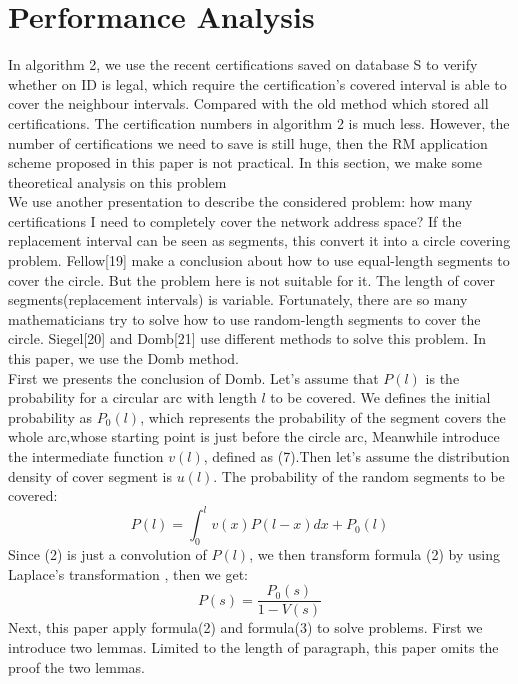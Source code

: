 \documentclass[10pt]{article}
\begin{document}
\section{Performance Analysis}
In algorithm 2, we use the recent certifications saved on database S to verify whether on ID is legal, which require the certification's covered interval is able to cover the neighbour intervals. Compared with the old method which stored all certifications.  The certification numbers in algorithm 2 is much less. However, the number of certifications we need to save is still huge, then the RM application scheme proposed in this paper is not practical. In this section, we make some theoretical analysis on this problem\\
We use another presentation to describe the considered problem: how many certifications I need to completely cover the network address space? If the replacement interval can be seen as segments, this convert it into a circle covering problem.  Fellow[19] make a conclusion about how to use equal-length segments to cover the circle. But the problem here is not suitable for it. The length of cover segments(replacement intervals) is variable. Fortunately, there are so many mathematicians try to solve how to use random-length segments to cover the circle. Siegel[20] and Domb[21] use different methods to solve this problem. In this paper, we use the Domb method.\\
First we presents the conclusion of Domb. Let's assume that $P(l)$ is the probability for a circular arc with length $l$ to be covered. We defines the initial probability as $P_0(l)$, which represents the probability of the segment covers the whole arc,whose starting point is just before the circle arc, Meanwhile introduce the intermediate function $v(l)$, defined as (7).Then let's assume the distribution density of cover segment is $u(l)$. The probability of the random segments to be covered:
\begin{equation}
    P(l)=\int_{0}^{l} v(x)P(l-x)dx+P_0(l)
\end{equation}
Since (2) is just a convolution of $P(l)$, we then transform formula (2) by using Laplace's transformation , then we get:
\begin{equation}
    P(s)=\frac{P_0(s)}{1-V(s)}
\end{equation}
Next, this paper apply formula(2) and formula(3) to solve problems. First we introduce two lemmas. Limited to the length of paragraph, this paper omits the proof the two lemmas. 
\end{document}
